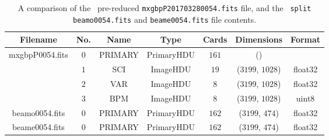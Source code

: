 \newcommand\mc[1]{\multicolumn{1}{c|}{#1}} %

\begin{table}[t]
    \centering
    \begin{tabular}{ccccccc}
        \hline
        Filename            & No. & Name    & Type       & Cards & Dimensions   & Format  \\ \hline
        \mc{\multirow{4}{*}{\parbox[c]{1.8cm}{mxgbpP\-0054.fits}}}
                            & $0$ & \gls{PRIMARY} & PrimaryHDU & $161$   & ()           &  \\
        \mc{}               & $1$ & \gls{SCI}     & ImageHDU   & $19$    & ($3199$, $1028$) & float32 \\
        \mc{}               & $2$ & \gls{VAR}     & ImageHDU   & $8$     & ($3199$, $1028$) & float32 \\
        \mc{}               & $3$ & \gls{BPM}     & ImageHDU   & $8$     & ($3199$, $1028$) & uint8   \\
        \mc{beamo0054.fits} & $0$ & \gls{PRIMARY} & PrimaryHDU & $162$   & ($3199$, $474$)  & float32 \\
        \mc{beame0054.fits} & $0$ & \gls{PRIMARY} & PrimaryHDU & $162$   & ($3199$, $474$)  & float32 \\ \hline
    \end{tabular}
    \caption{A comparison of the \polsalt\ pre-reduced \texttt{mxgbpP201703280054.fits} file, and the \stops\ \texttt{split} \texttt{beamo0054.fits} and \texttt{beame0054.fits} file contents.}
    \label{table:split_info}
\end{table}
